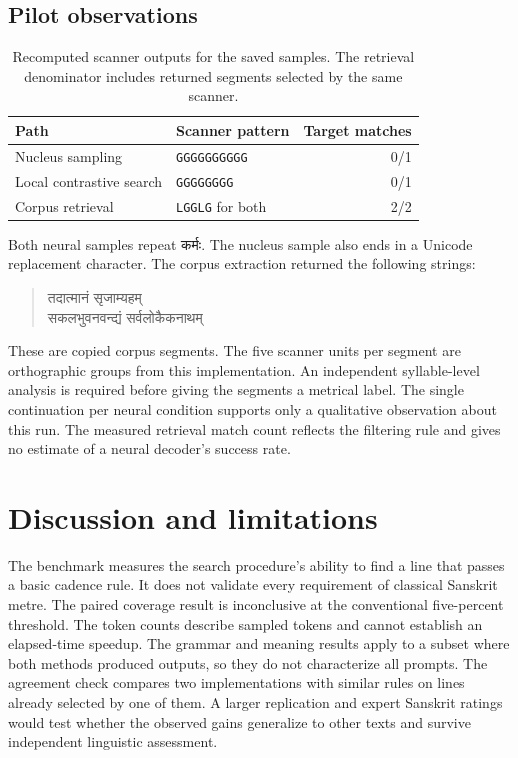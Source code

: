 \documentclass[11pt]{article}
\newcommand{\stext}[1]{{\dev #1}}
\begin{document}
\subsection{Pilot observations}
\begin{table}[ht]
\small
\begin{tabularx}{\linewidth}{@{}lXr@{}}
\toprule
Path & Scanner pattern & Target matches\\
\midrule
Nucleus sampling & \texttt{GGGGGGGGGG} & 0/1\\
Local contrastive search & \texttt{GGGGGGGG} & 0/1\\
Corpus retrieval & \texttt{LGGLG} for both & 2/2\\
\bottomrule
\end{tabularx}
\caption{Recomputed scanner outputs for the saved samples. The retrieval denominator includes returned segments selected by the same scanner.}
\end{table}
Both neural samples repeat \stext{कर्मः}. The nucleus sample also ends in a Unicode replacement character. The corpus extraction returned the following strings:
\begin{quote}
\stext{तदात्मानं सृजाम्यहम्}\\
\stext{सकलभुवनवन्द्यं सर्वलोकैकनाथम्}
\end{quote}
These are copied corpus segments. The five scanner units per segment are orthographic groups from this implementation. An independent syllable-level analysis is required before giving the segments a metrical label. The single continuation per neural condition supports only a qualitative observation about this run. The measured retrieval match count reflects the filtering rule and gives no estimate of a neural decoder's success rate.

\section{Discussion and limitations}
The benchmark measures the search procedure's ability to find a line that passes a basic cadence rule. It does not validate every requirement of classical Sanskrit metre. The paired coverage result is inconclusive at the conventional five-percent threshold. The token counts describe sampled tokens and cannot establish an elapsed-time speedup. The grammar and meaning results apply to a subset where both methods produced outputs, so they do not characterize all prompts. The agreement check compares two implementations with similar rules on lines already selected by one of them. A larger replication and expert Sanskrit ratings would test whether the observed gains generalize to other texts and survive independent linguistic assessment.
\end{document}
